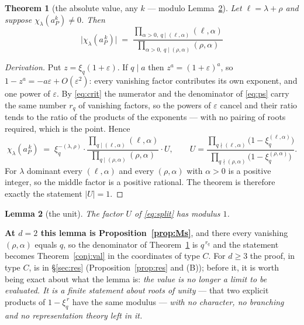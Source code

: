 \documentclass[11pt,a4paper]{article}
\newtheorem{theorem}{Theorem}[section]
\newtheorem{lemma}[theorem]{Lemma}
\theoremstyle{definition}
\begin{document}
\begin{theorem}[the absolute value, any $k$ --- modulo Lemma~\ref{lem:unit}]\label{thm:valgen}
Let $\ell=\lambda+\rho$ and suppose $\chi_\lambda(a_P^k)\neq0$. Then
\[
\boxed{\;\bigl|\chi_\lambda(a_P^{\,k})\bigr|\;=\;
\frac{\prod_{\alpha>0,\ q\mid(\ell,\alpha)}(\ell,\alpha)}
     {\prod_{\alpha>0,\ q\mid(\rho,\alpha)}(\rho,\alpha)}\;}
\]
\end{theorem}

\begin{proof}[Derivation]
Put $z=\xi_q(1+\varepsilon)$. If $q\mid a$ then $z^a=(1+\varepsilon)^a$, so
$1-z^a=-a\varepsilon+O(\varepsilon^2)$: every vanishing factor contributes its own exponent, and one
power of $\varepsilon$. By \eqref{eq:crit} the numerator and the denominator of \eqref{eq:ps} carry
the same number $r_q$ of vanishing factors, so the powers of $\varepsilon$ cancel and their ratio
tends to the ratio of the products of the exponents --- with no pairing of roots required, which is
the point. Hence
\begin{equation}\label{eq:split}
\chi_\lambda(a_P^{\,k})\;=\;\xi_q^{-(\lambda,\rho)}\cdot
\frac{\prod_{q\mid(\ell,\alpha)}(\ell,\alpha)}{\prod_{q\mid(\rho,\alpha)}(\rho,\alpha)}\cdot U,
\qquad
U=\frac{\prod_{q\nmid(\ell,\alpha)}\bigl(1-\xi_q^{(\ell,\alpha)}\bigr)}
        {\prod_{q\nmid(\rho,\alpha)}\bigl(1-\xi_q^{(\rho,\alpha)}\bigr)} .
\end{equation}
For $\lambda$ dominant every $(\ell,\alpha)$ and every $(\rho,\alpha)$ with $\alpha>0$ is a positive
integer, so the middle factor is a positive rational. The theorem is therefore exactly the statement
$|U|=1$.
\end{proof}

\begin{lemma}[the unit]\label{lem:unit}
The factor $U$ of \eqref{eq:split} has modulus $1$.
\end{lemma}

\noindent \textbf{At $d=2$ this lemma is Proposition~\ref{prop:Ms}}, and there every vanishing
$(\rho,\alpha)$ equals $q$, so the denominator of Theorem~\ref{thm:valgen} is $q^{\,r_q}$ and the
statement becomes Theorem~\ref{conj:val} in the coordinates of type $C$. For $d\ge3$ the proof, in
type $C$, is in \S\ref{sec:res} (Proposition~\ref{prop:res} and (B)); before it, it is worth being
exact about what the lemma is: \emph{the value is no longer a limit to be
evaluated. It is a finite statement about roots of unity} --- that two explicit products of
$1-\xi_q^{\,r}$ have the same modulus --- \emph{with no character, no branching and no
representation theory left in it.}
\end{document}

